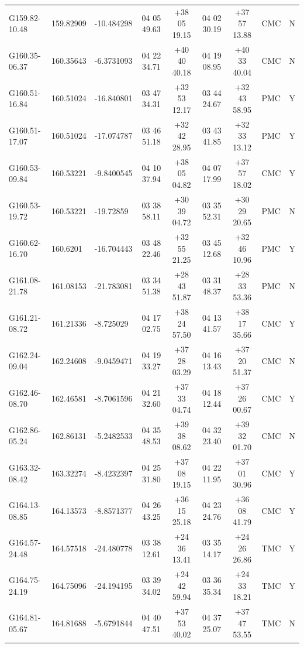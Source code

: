 \documentclass[UTF8, nocolorlinks]{pkuthss}
\begin{document}
\begin{footnotesize}
\begin{center}
\begin{supertabular}{lllcccclr}
		G159.82-10.48 & 159.82909 &  -10.484298   & 04 05 49.63 & +38 05 19.15 & 04 02 30.19 & +37 57 13.88   & CMC  & N\\
		G160.35-06.37 & 160.35643 &   -6.3731093  & 04 22 34.71 & +40 40 40.18 & 04 19 08.95 & +40 33 40.04   & CMC  & N\\
		G160.51-16.84 & 160.51024 &  -16.840801   & 03 47 34.31 & +32 53 12.17 & 03 44 24.67 & +32 43 58.95   & PMC  & Y\\
		G160.51-17.07 & 160.51024 &  -17.074787   & 03 46 51.18 & +32 42 28.95 & 03 43 41.85 & +32 33 13.12   & PMC  & Y\\
		G160.53-09.84 & 160.53221 &   -9.8400545  & 04 10 37.94 & +38 05 04.82 & 04 07 17.99 & +37 57 18.02   & CMC  & Y\\
		G160.53-19.72 & 160.53221 &  -19.72859    & 03 38 58.11 & +30 39 04.72 & 03 35 52.31 & +30 29 20.65   & PMC  & N\\
		G160.62-16.70 & 160.6201  &  -16.704443   & 03 48 22.46 & +32 55 21.25 & 03 45 12.68 & +32 46 10.96   & PMC  & Y\\
		G161.08-21.78 & 161.08153 &  -21.783081   & 03 34 51.38 & +28 43 51.87 & 03 31 48.37 & +28 33 53.36   & PMC  & N\\
		G161.21-08.72 & 161.21336 &   -8.725029   & 04 17 02.75 & +38 24 57.50 & 04 13 41.57 & +38 17 35.66   & CMC  & Y\\
		G162.24-09.04 & 162.24608 &   -9.0459471  & 04 19 33.27 & +37 28 03.29 & 04 16 13.43 & +37 20 51.37   & CMC  & N\\
		G162.46-08.70 & 162.46581 &   -8.7061596  & 04 21 32.60 & +37 33 04.74 & 04 18 12.44 & +37 26 00.67   & CMC  & Y\\
		G162.86-05.24 & 162.86131 &   -5.2482533  & 04 35 48.53 & +39 38 08.62 & 04 32 23.40 & +39 32 01.70   & CMC  & N\\
		G163.32-08.42 & 163.32274 &   -8.4232397  & 04 25 31.80 & +37 08 19.15 & 04 22 11.95 & +37 01 30.96   & CMC  & Y\\
		G164.13-08.85 & 164.13573 &   -8.8571377  & 04 26 43.25 & +36 15 25.18 & 04 23 24.76 & +36 08 41.79   & CMC  & Y\\
		G164.57-24.48 & 164.57518 &  -24.480778   & 03 38 12.61 & +24 36 13.41 & 03 35 14.17 & +24 26 26.86   & TMC  & Y\\
		G164.75-24.19 & 164.75096 &  -24.194195   & 03 39 34.02 & +24 42 59.94 & 03 36 35.34 & +24 33 18.21   & TMC  & Y\\
		G164.81-05.67 & 164.81688 &   -5.6791844  & 04 40 47.51 & +37 53 40.02 & 04 37 25.07 & +37 47 53.55   & TMC  & N\\

\end{supertabular}
\end{center}
\end{footnotesize}
\end{document}
